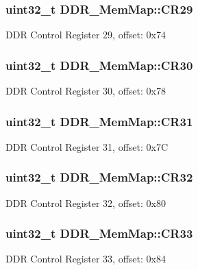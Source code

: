 \subsubsection[{C\+R29}]{\setlength{\rightskip}{0pt plus 5cm}uint32\+\_\+t D\+D\+R\+\_\+\+Mem\+Map\+::\+C\+R29}\label{struct_d_d_r___mem_map_adee1e94d48aa891470fcc563ab5c5700}
D\+D\+R Control Register 29, offset\+: 0x74 \hypertarget{struct_d_d_r___mem_map_a59f41db78077b2e7dd402a1d49b40764}{}
\subsubsection[{C\+R30}]{\setlength{\rightskip}{0pt plus 5cm}uint32\+\_\+t D\+D\+R\+\_\+\+Mem\+Map\+::\+C\+R30}\label{struct_d_d_r___mem_map_a59f41db78077b2e7dd402a1d49b40764}
D\+D\+R Control Register 30, offset\+: 0x78 \hypertarget{struct_d_d_r___mem_map_a460cfa793e76472e96f64649fc093ac4}{}
\subsubsection[{C\+R31}]{\setlength{\rightskip}{0pt plus 5cm}uint32\+\_\+t D\+D\+R\+\_\+\+Mem\+Map\+::\+C\+R31}\label{struct_d_d_r___mem_map_a460cfa793e76472e96f64649fc093ac4}
D\+D\+R Control Register 31, offset\+: 0x7\+C \hypertarget{struct_d_d_r___mem_map_a5db95193522f0312b7e88a1018a7f59a}{}
\subsubsection[{C\+R32}]{\setlength{\rightskip}{0pt plus 5cm}uint32\+\_\+t D\+D\+R\+\_\+\+Mem\+Map\+::\+C\+R32}\label{struct_d_d_r___mem_map_a5db95193522f0312b7e88a1018a7f59a}
D\+D\+R Control Register 32, offset\+: 0x80 \hypertarget{struct_d_d_r___mem_map_a0ddb475de931a1a495662a1109ef8adc}{}
\subsubsection[{C\+R33}]{\setlength{\rightskip}{0pt plus 5cm}uint32\+\_\+t D\+D\+R\+\_\+\+Mem\+Map\+::\+C\+R33}\label{struct_d_d_r___mem_map_a0ddb475de931a1a495662a1109ef8adc}
D\+D\+R Control Register 33, offset\+: 0x84 \hypertarget{struct_d_d_r___mem_map_a71d3b5c9058043fba985cb2d4553af1b}{}
